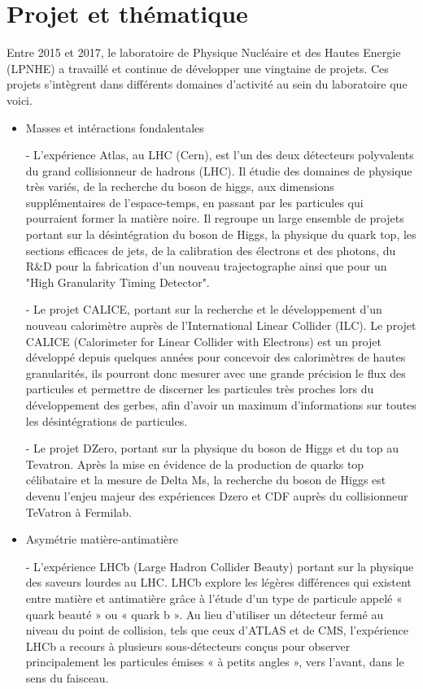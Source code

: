\documentclass[french,a4paper,12pt]{report}
\begin{document}
  \newpage
  
  \section{Projet et thématique}
  
		Entre 2015 et 2017, le laboratoire de Physique Nucléaire et des Hautes Energie (LPNHE) a travaillé et continue de développer une vingtaine de projets. Ces projets s'intègrent dans différents domaines d'activité au sein du laboratoire que voici.
  	
  \begin{itemize}
		\item Masses et intéractions fondalentales
		
			- L'expérience Atlas, au LHC (Cern), est l'un des deux détecteurs polyvalents du grand collisionneur de hadrons (LHC). Il étudie des domaines de physique très variés, de la recherche du boson de higgs, aux dimensions supplémentaires de l'espace-temps, en passant par les particules qui pourraient former la matière noire. Il regroupe un large ensemble de projets portant sur la désintégration du boson de Higgs, la physique du quark top, les sections efficaces de jets, de la calibration des électrons et des photons, du R\&D pour la fabrication d'un nouveau trajectographe ainsi que pour un "High Granularity Timing Detector".
			
			- Le projet CALICE, portant sur la recherche et le développement d'un nouveau calorimètre auprès de l'International Linear Collider (ILC). Le projet CALICE (Calorimeter for Linear Collider with Electrons) est un projet développé depuis quelques années pour concevoir des calorimètres de hautes granularités, ils pourront donc mesurer avec une grande précision le flux des particules et permettre de discerner les particules très proches lors du développement des gerbes, afin d'avoir un maximum d'informations sur toutes les désintégrations de particules.			
			
			- Le projet DZero, portant sur la physique du boson de Higgs et du top au Tevatron. Après la mise en évidence de la production de quarks top célibataire et la mesure de Delta Ms, la recherche du boson de Higgs est devenu l'enjeu majeur des expériences Dzero et CDF auprès du collisionneur TeVatron à Fermilab. 
			
		\item Asymétrie matière-antimatière
		
			- L'expérience LHCb (Large Hadron Collider Beauty) portant sur la physique des saveurs lourdes au LHC.
				LHCb explore les légères différences qui existent entre matière et antimatière grâce à l’étude d’un type de particule appelé « quark beauté » ou « quark b ». Au lieu d’utiliser un détecteur fermé au niveau du point de collision, tels que ceux d’ATLAS et de CMS, l’expérience LHCb a recours à plusieurs sous-détecteurs conçus pour observer principalement les particules émises « à petits angles », vers l’avant, dans le sens du faisceau.
			

\end{itemize}
\end{document}
